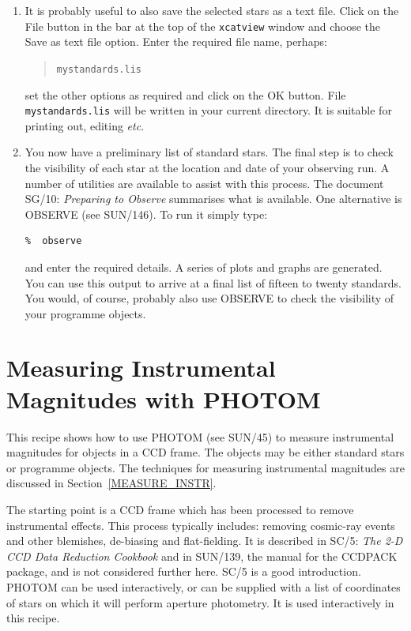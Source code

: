 \documentclass[twoside,11pt]{article}
\newcommand{\xref}[3]{#1}
\newcommand{\xlabel}[1]{}
\begin{document}
\begin{enumerate}
  \item It is probably useful to also save the selected stars as a 
   text file.  Click on the {\sf File} button in the bar at the top of
   the {\tt xcatview} window and choose the {\sf Save as text file}
   option.  Enter the required file name, perhaps:

  \begin{verse}
   {\tt mystandards.lis}
  \end{verse}

   set the other options as required and click on the {\sf OK} button.
   File {\tt mystandards.lis} will be written in your current directory.
   It is suitable for printing out, editing \emph{etc}.

  \item You now have a preliminary list of standard stars.  The final
   step is to check the visibility of each star at the location and
   date of your observing run.  A number of utilities are available to
   assist with this process.  The document \xref{SG/10: {\it Preparing
   to Observe}}{sg10}{}\/\cite{SG10} summarises what is available.  One
   alternative is OBSERVE (see \xref{SUN/146}{sun146}{}\cite{SUN146}).
   To run it simply type:

\begin{verbatim}
%  observe
\end{verbatim}

   and enter the required details.  A series of plots and graphs are
   generated.  You can use this output to arrive at a final list of
   fifteen to twenty standards.  You would, of course, probably also
   use OBSERVE to check the visibility of your programme objects.

\end{enumerate}



\newpage
\section{\xlabel{PHOTOM_RECIP}\label{PHOTOM_RECIP}Measuring Instrumental
Magnitudes with PHOTOM}

This recipe shows how to use PHOTOM (see \xref{SUN/45}{sun45}{}\cite{SUN45})
to measure instrumental magnitudes for objects in a CCD frame.  The
objects may be either standard stars or programme objects.  The
techniques for measuring instrumental magnitudes are discussed in
Section~\ref{MEASURE_INSTR}.

The starting point is a CCD frame which has been processed to remove
instrumental effects.  This process typically includes: removing
cosmic-ray events and other blemishes, de-biasing and flat-fielding.  It
is described in \xref{SC/5: {\it The 2-D CCD Data Reduction
Cookbook}}{sc5}{}\/\cite{SC5} and in \xref{SUN/139}{sun139}{}\cite{SUN139},
the manual for the CCDPACK package, and is not considered further here.
SC/5 is a good introduction.  PHOTOM can be used interactively, or can be
supplied with a list of coordinates of stars on which it will perform
aperture photometry.  It is used interactively in this recipe.
\end{document}
